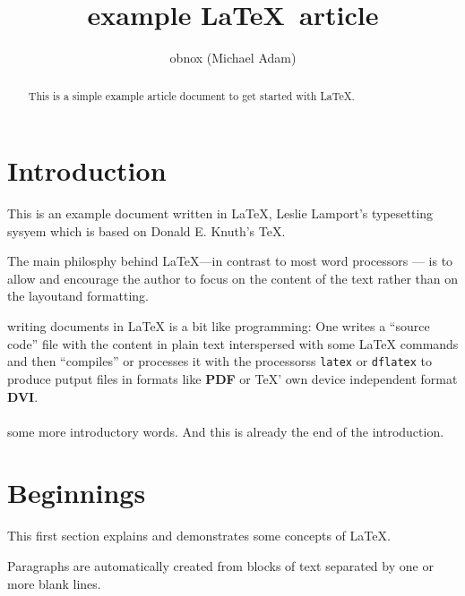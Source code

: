\documentclass{article}
\title{example \LaTeX\ article}
\author{obnox (Michael Adam)}
\begin{document}
\maketitle

\begin{abstract}

    This is a simple  example article document to get started with  {\LaTeX}.

\end{abstract}

\tableofcontents

\section*{Introduction}

This is an example document written in {\LaTeX}, Leslie Lamport's typesetting
sysyem which is based on Donald E. Knuth's {\TeX}.

The main philosphy behind {\LaTeX}---in contrast to most word processors --- is to allow and encourage the author to
focus on the content of the text rather than on the layoutand formatting.

writing documents in {\LaTeX} is a bit like programming: One writes a ``source code''  file with the content in plain text
interspersed with some {\LaTeX} commands
and then ``compiles'' or processes it with the processorss \verb|latex| or \verb|dflatex| to produce
putput files in formats like \textbf{PDF} or {\TeX}' own device independent format \textbf{DVI}.


\paragraph{}some more introductory words.
And this is already the end of the introduction.




\section{Beginnings}
\label{sec:beginnings}

This first section explains and demonstrates some concepts of {\LaTeX}.

Paragraphs are automatically created from blocks of text separated by one or more
blank lines.
\end{document}
